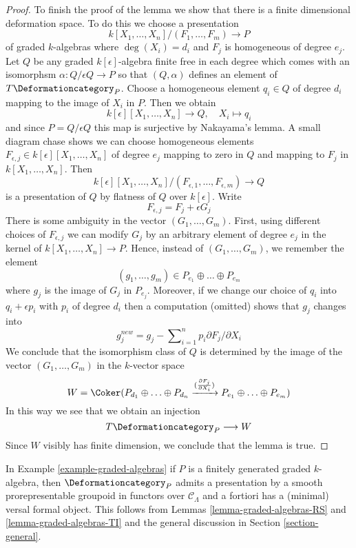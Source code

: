 \begin{proof}
\medskip\noindent
To finish the proof of the lemma we show that there is a finite
dimensional deformation space. To do this we
choose a presentation
$$
k[X_1, \ldots, X_n]/(F_1, \ldots, F_m) \longrightarrow P
$$
of graded $k$-algebras where $\deg(X_i) = d_i$ and
$F_j$ is homogeneous of degree $e_j$.
Let $Q$ be any graded $k[\epsilon]$-algebra
finite free in each degree which comes with an isomorphsm
$\alpha : Q/\epsilon Q \to P$ so that $(Q, \alpha)$ defines
an element of $T\Deformationcategory_P$.
Choose a homogeneous element $q_i \in Q$ of degree $d_i$
mapping to the image of $X_i$ in $P$.
Then we obtain
$$
k[\epsilon][X_1, \ldots, X_n] \longrightarrow Q,\quad
X_i \longmapsto q_i
$$
and since $P = Q/\epsilon Q$ this map is surjective by Nakayama's lemma.
A small diagram chase shows we can choose homogeneous elements
$F_{\epsilon, j} \in k[\epsilon][X_1, \ldots, X_n]$ of degree $e_j$
mapping to zero in $Q$ and mapping to $F_j$ in $k[X_1, \ldots, X_n]$.
Then
$$
k[\epsilon][X_1, \ldots, X_n]/(F_{\epsilon, 1}, \ldots, F_{\epsilon, m})
\longrightarrow Q
$$
is a presentation of $Q$ by flatness of $Q$ over $k[\epsilon]$.
Write
$$
F_{\epsilon, j} =  F_j + \epsilon G_j
$$
There is some ambiguity in the vector $(G_1, \ldots, G_m)$.
First, using different choices of $F_{\epsilon, j}$
we can modify $G_j$ by an arbitrary element of degree $e_j$
in the kernel of $k[X_1, \ldots, X_n] \to P$.
Hence, instead of $(G_1, \ldots, G_m)$, we remember the
element
$$
(g_1, \ldots, g_m) \in P_{e_1} \oplus \ldots \oplus P_{e_m}
$$
where $g_j$ is the image of $G_j$ in $P_{e_j}$.
Moreover, if we change our choice of $q_i$ into $q_i + \epsilon p_i$
with $p_i$ of degree $d_i$ then a computation (omitted) shows
that $g_j$ changes into
$$
g_j^{new} = g_j - \sum\nolimits_{i = 1}^n p_i \partial F_j / \partial X_i
$$
We conclude that the isomorphism class of $Q$ is determined by the
image of the vector $(G_1, \ldots, G_m)$ in the $k$-vector space
$$
W  = \Coker(P_{d_1} \oplus \ldots \oplus P_{d_n}
\xrightarrow{(\frac{\partial F_j}{\partial X_i})}
P_{e_1} \oplus \ldots \oplus P_{e_m})
$$
In this way we see that we obtain an injection
$$
T\Deformationcategory_P \longrightarrow W
$$
Since $W$ visibly has finite dimension, we conclude that the lemma is true.
\end{proof}

\noindent
In Example \ref{example-graded-algebras} if $P$ is a finitely generated
graded $k$-algebra, then $\Deformationcategory_P$
admits a presentation by a smooth prorepresentable groupoid in functors
over $\mathcal{C}_\Lambda$
and a fortiori has a (minimal) versal formal object. This follows
from Lemmas \ref{lemma-graded-algebras-RS} and
\ref{lemma-graded-algebras-TI}
and the general discussion in Section \ref{section-general}.

